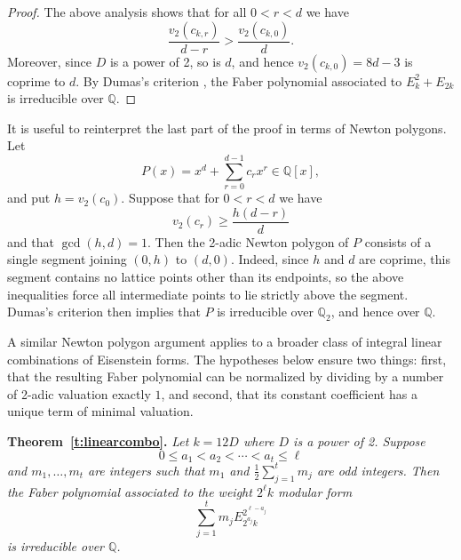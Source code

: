 \documentclass[12pt]{amsart}
\begin{document}
\begin{proof}
The above analysis shows that for all $0<r<d$ we have
\[ \frac{v_2(c_{k,r})}{d-r} > \frac{v_2(c_{k,0})}{d}.\] Moreover, since $D$ is a power of 2, so is $d$, and hence $v_2(c_{k,0})=8d-3$ is coprime to $d$. By Dumas's criterion \cite[Corollary 1.3]{Dumas}, the Faber polynomial associated to $E_{k}^2+E_{2k}$ is irreducible over $\mathbb{Q}$. 
\end{proof}

\bigskip

It is useful to reinterpret the last part of the proof in terms of Newton
polygons. Let
\[
P(x)=x^d+\sum_{r=0}^{d-1}c_rx^r\in \mathbb Q[x],
\]
and put $h=v_2(c_0)$. Suppose that for $0<r<d$ we have
\[ v_2(c_r)\ge \frac{h(d-r)}{d}\]
and that $\gcd(h,d)=1$. Then the 2-adic Newton polygon of $P$ consists of a
single segment joining $(0,h)$ to $(d,0)$. Indeed, since $h$ and $d$
are coprime, this segment contains no lattice points other than its endpoints, so the above inequalities force all intermediate points to lie strictly above the segment. Dumas's criterion then implies that $P$ is irreducible over $\mathbb Q_2$, and hence over $\mathbb Q$.

A similar Newton polygon argument applies to a broader class of integral linear combinations of Eisenstein forms.  The hypotheses below ensure two things: first, that the resulting Faber polynomial can be normalized by dividing by a number of 2-adic valuation exactly $1$, and second, that its constant coefficient has a unique term of minimal valuation.

\bigskip

\noindent\textbf{Theorem~\ref{t:linearcombo}.}
\textit{Let $k=12D$ where $D$ is a power of 2. Suppose \[0\leq a_1 <a_2<\cdots <a_t\leq \ell\] and $m_1,\ldots, m_t$ are integers such that $m_1$ and $\frac{1}{2}\sum_{j=1}^t m_j$ are odd integers. Then the Faber polynomial associated to the weight $2^\ell k$ modular form \[\sum_{j=1}^t m_j E_{2^{a_j}k}^{2^{\ell-a_j}}\] is irreducible over $\mathbb{Q}$. }
\end{document}
